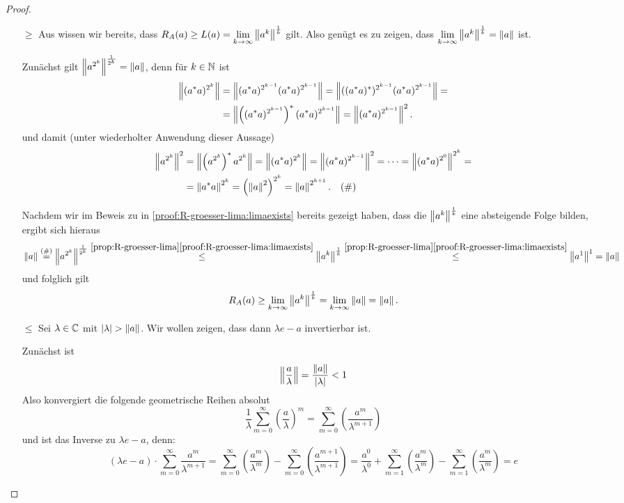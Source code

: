 \begin{proof}

\begin{itemize}
	\item[\glqq$\geq$\grqq] Aus  wissen wir bereits, dass $R_A(a) \geq L(a) = \underset{k\to\infty}{\lim}\left\lVert a^k\right\rVert^\frac{1}{k}$ gilt. Also genügt es zu zeigen, dass $\underset{k\to\infty}{\lim}\left\lVert a^k\right\rVert^\frac{1}{k} = \left\lVert a\right\rVert$ ist.
	
Zunächst gilt $\left\lVert a^{2^k}\right\rVert^\frac{1}{2^k} = \left\lVert a\right\rVert$, denn für $k \in \mathbb{N}$ ist
	\begin{align*}
	\left\lVert(a^*a)^{2^k}\right\rVert &= \left\lVert(a^*a)^{2^{k-1}}(a^*a)^{2^{k-1}}\right\rVert = \left\lVert((a^*a)^*)^{2^{k-1}}(a^*a)^{2^{k-1}}\right\rVert = \\
	&= \left\lVert\left((a^*a)^{2^{k-1}}\right)^*(a^*a)^{2^{k-1}}\right\rVert = \left\lVert(a^*a)^{2^{k-1}}\right\rVert^2.
	\end{align*}
und damit (unter wiederholter Anwendung dieser Aussage)
	\begin{align*}
	\left\lVert a^{2^k}\right\rVert^2 &= \left\lVert\left(a^{2^k}\right)^*a^{2^k}\right\rVert = \left\lVert(a^*a)^{2^k}\right\rVert = \left\lVert(a^*a)^{2^{k-1}}\right\rVert^2 = \dots = \left\lVert(a^*a)^{2^{0}}\right\rVert^{2^k} = \\
	&= \left\lVert a^*a\right\rVert^{2^k} = \left(\left\lVert a\right\rVert^2\right)^{2^k} = \left\lVert a\right\rVert^{2^{k+1}}. \quad (\#)
	\end{align*}	
	
Nachdem wir im Beweis zu  in \ref{proof:R-groesser-lima:limaexists} bereits gezeigt haben, dass die $\left\lVert a^k\right\rVert^\frac{1}{k}$ eine absteigende Folge bilden, ergibt sich hieraus
	\[\norm{a} \overset{(\#)}{=} \norm{a^{2^k}}^\frac{1}{2^k} \overset{\ref*{prop:R-groesser-lima}\ref*{proof:R-groesser-lima:limaexists}}{\leq} \norm{a^{k}}^\frac{1}{k} \overset{\ref*{prop:R-groesser-lima}\ref*{proof:R-groesser-lima:limaexists}}{\leq} \norm{a^1}^1 = \norm{a}\]
und folglich gilt
	\[R_A(a) \geq \underset{k\to\infty}{\lim}\left\lVert a^k\right\rVert^\frac{1}{k} = \underset{k\to\infty}{\lim}\left\lVert a\right\rVert = \left\lVert a\right\rVert.\]	
	
	
	\item[\glqq$\leq$\grqq] Sei $\lambda \in \mathbb{C}$ mit $|\lambda| > \left\lVert a\right\rVert$. Wir wollen zeigen, dass dann $\lambda e - a$ invertierbar ist.

Zunächst ist
	\[\left\lVert\frac{a}{\lambda}\right\rVert = \frac{\left\lVert a\right\rVert}{|\lambda|} < 1\]
Also konvergiert die folgende geometrische Reihen absolut
	\[\frac{1}{\lambda}\sum_{m=0}^\infty\left(\frac{a}{\lambda}\right)^m = \sum_{m=0}^\infty\left(\frac{a^m}{\lambda^{m+1}}\right) \]
und ist das Inverse zu $\lambda e - a$, denn:
	\[(\lambda e - a)\cdot \sum_{m=0}^\infty\frac{a^m}{\lambda^{m+1}} = \sum_{m=0}^\infty\left(\frac{a^m}{\lambda^{m}}\right) - \sum_{m=0}^\infty\left(\frac{a^{m+1}}{\lambda^{m+1}}\right) = \frac{a^0}{\lambda^0} +  \sum_{m=1}^\infty\left(\frac{a^m}{\lambda^{m}}\right) - \sum_{m=1}^\infty\left(\frac{a^m}{\lambda^{m}}\right) = e\]
	

\end{itemize}
\end{proof}
